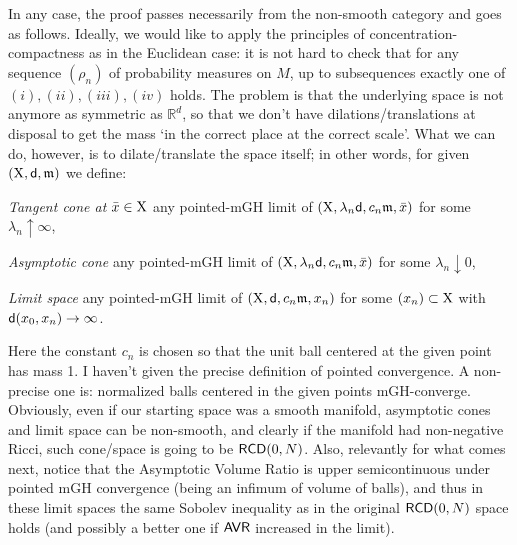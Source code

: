 \documentclass[11pt]{article}
\numberwithin{equation}{section}
\newcommand{\R}{\mathbb{R}}
\newcommand{\X}{{\rm X}}
\newcommand{\sfd}{{\sf d}}
\newcommand{\mm}{{\mathfrak m}}
\newcommand{\RCD}{{\sf RCD}}
\newcommand{\AVR}{{\sf AVR}}
\begin{document}
In any case, the proof passes necessarily from the non-smooth category and goes as follows. Ideally, we would like to apply the principles of concentration-compactness as in the Euclidean case: it is not hard to check that for any sequence $(\rho_n)$ of probability measures on $M$, up to subsequences exactly one of $(i),(ii),(iii),(iv)$ holds. The problem is that the underlying space is not anymore as symmetric as $\R^d$, so that we don't have dilations/translations at disposal to get the mass `in the correct place at the correct scale'. What we can do, however, is to dilate/translate the space itself; in other words, for given $(\X,\sfd,\mm)$ we define:

\noindent \emph{Tangent cone at $\bar x\in\X$} any pointed-mGH limit of  $(\X,\lambda_n\sfd,c_n\mm,\bar x)$ for some $\lambda_n\uparrow\infty$,

\noindent\emph{Asymptotic cone} any pointed-mGH limit of  $(\X,\lambda_n\sfd,c_n\mm,\bar x)$ for some $\lambda_n\downarrow 0$,

\noindent \emph{Limit space} any pointed-mGH limit of $(\X,\sfd,c_n\mm,x_n)$ for some $(x_n)\subset\X$ with $\sfd(x_0,x_n)\to\infty$.

Here the constant $c_n$ is chosen so that the unit ball centered at the given point has mass 1. I haven't given the precise definition of pointed convergence. A non-precise one is: normalized balls centered in the given points mGH-converge. Obviously, even if our starting space was a smooth manifold, asymptotic cones and limit space can be non-smooth, and clearly if the manifold had non-negative Ricci, such cone/space is going to be $\RCD(0,N)$. Also, relevantly for what comes next, notice that the Asymptotic Volume Ratio is upper semicontinuous under pointed mGH convergence (being an infimum of volume of balls), and thus in these limit spaces the same Sobolev inequality as in the original $\RCD(0,N)$ space holds (and possibly a better one if $\AVR$ increased in the limit).
\end{document}
